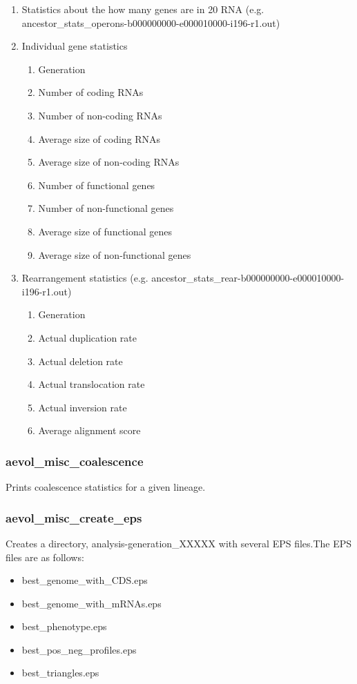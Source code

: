 \begin{enumerate}
\begin{enumerate}
	\end{enumerate}
	\item Statistics about the how many genes are in 20 RNA (e.g. ancestor\_stats\_operons-b000000000-e000010000-i196-r1.out)
	\item Individual gene statistics
	\begin{enumerate}
		\item Generation
		\item Number of coding RNAs
		\item Number of non-coding RNAs
		\item Average size of coding RNAs
		\item Average size of non-coding RNAs
		\item Number of functional genes
		\item Number of non-functional genes
		\item Average size of functional genes
		\item Average size of non-functional genes
	\end{enumerate}
	\item Rearrangement statistics (e.g. ancestor\_stats\_rear-b000000000-e000010000-i196-r1.out)
	\begin{enumerate}
		\item Generation
		\item Actual duplication rate
		\item Actual deletion rate
		\item Actual translocation rate
		\item Actual inversion rate
		\item Average alignment score
	\end{enumerate}
\end{enumerate}


\subsubsection{aevol\_misc\_coalescence}
Prints coalescence statistics for a given lineage.

\subsubsection{aevol\_misc\_create\_eps}
Creates a directory, analysis-generation\_XXXXX with several EPS files.The EPS files are as follows:
\begin{itemize}
	\item best\_genome\_with\_CDS.eps 
	\item best\_genome\_with\_mRNAs.eps
	\item best\_phenotype.eps
	\item best\_pos\_neg\_profiles.eps
	\item best\_triangles.eps
\end{itemize}

